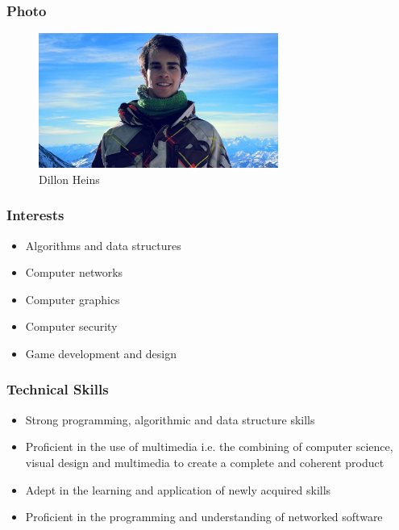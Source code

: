 \documentclass{article}
\begin{document}
	\subsubsection{Photo}
		\begin{figure}[H]
			\centering
			\includegraphics[width=0.7\textwidth]{../dillon.jpg}
			\caption{Dillon Heins}
		\end{figure}
	\subsubsection{Interests}
		\begin{itemize}
			\item Algorithms and data structures
			\item Computer networks
			\item Computer graphics
			\item Computer security
			\item Game development and design
		\end{itemize}
	\subsubsection{Technical Skills}
		\begin{itemize}
			\item Strong programming, algorithmic and data structure skills
			\item Proficient in the use of multimedia i.e. the combining of computer science, visual design and multimedia to create a complete and coherent product
			\item Adept in the learning and application of newly acquired skills
			\item Proficient in the programming and understanding of networked software
		\end{itemize}
\end{document}
